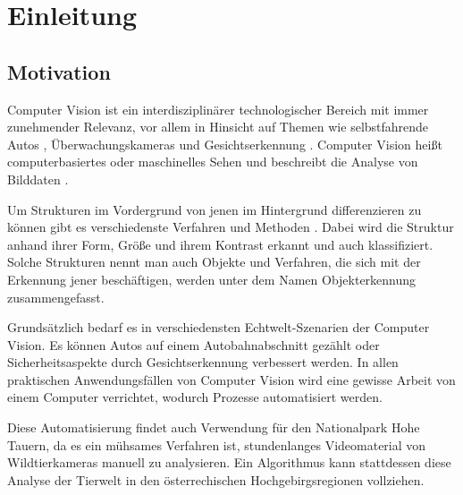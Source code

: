 \chapter{Einleitung}
\label{cha:Einleitung}

\section{Motivation}
Computer Vision ist ein interdisziplinärer technologischer Bereich mit immer zunehmender Relevanz, vor allem in Hinsicht auf Themen wie selbstfahrende Autos \cite{AutonomousDriving}, Überwachungskameras \cite{VideoSurveillance} und Gesichtserkennung \cite{FacialRecognition}. Computer Vision heißt computerbasiertes oder maschinelles Sehen und beschreibt die Analyse von Bilddaten \cite{WikipediaComputerV}. \par

Um Strukturen im Vordergrund von jenen im Hintergrund differenzieren zu können gibt es verschiedenste Verfahren und Methoden \cite{ObjectDetectionIntroductionOnline}. Dabei wird die Struktur anhand ihrer Form, Größe und ihrem Kontrast erkannt und auch klassifiziert. Solche Strukturen nennt man auch Objekte und Verfahren, die sich mit der Erkennung jener beschäftigen, werden unter dem Namen Objekterkennung \cite{ObjectDetectionNeuralNetworks} zusammengefasst. \par
Grundsätzlich bedarf es in verschiedensten Echtwelt-Szenarien der Computer Vision. Es können Autos auf einem Autobahnabschnitt gezählt oder Sicherheitsaspekte durch Gesichtserkennung verbessert werden. In allen praktischen Anwendungsfällen von Computer
Vision wird eine gewisse Arbeit von einem Computer verrichtet, wodurch Prozesse
automatisiert werden.\par
Diese Automatisierung findet auch Verwendung für den Nationalpark Hohe Tauern, da es ein mühsames Verfahren ist, stundenlanges Videomaterial von Wildtierkameras manuell zu analysieren. Ein Algorithmus kann stattdessen diese Analyse der Tierwelt in den österrechischen Hochgebirgsregionen vollziehen.

